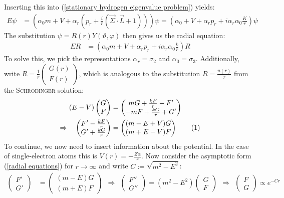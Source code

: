 \documentclass[a4paper,12pt]{article}
\newcommand\numberthis{\addtocounter{equation}{1}\tag{\theequation}}
\newcommand{\kla}{}
\begin{document}
Inserting this into (\ref{stationary hydrogen eigenvalue problem}) yields:
\begin{align*}
E\psi&=\kla\left( {\alpha_0m+V+\alpha_r\kla\left( {p_r+\frac{i}{r}(\vec{\Sigma}\cdot\vec{L}+1)} \right)} \right)\psi=\kla\left( {\alpha_0+V+\alpha_rp_r+i\alpha_r\alpha_0\frac{K}{r}} \right)\psi
\end{align*}
The substitution $\psi=R(r)Y(\vartheta,\varphi)$ then gives us the radial equation:
\begin{align*}
ER&=\kla\left( {\alpha_0m+V+\alpha_rp_r+i\alpha_r\alpha_0\frac{k}{r}} \right)R
\end{align*}
To solve this, we pick the representations $\alpha_r=\sigma_2$ and $\alpha_0=\sigma_3$. Additionally, write $R=\frac{1}{r}\begin{pmatrix}
G(r) \\ F(r)
\end{pmatrix} $, which is analogous to the substitution $R=\frac{u(r)}{r}$ from the \textsc{Schrödinger} solution:
\begin{align*}
(E-V)\begin{pmatrix}
G \\ F
\end{pmatrix}&=\begin{pmatrix}
mG+\frac{kF}{r}-F' \\ -mF+\frac{kG}{r}+G'
\end{pmatrix} \\
\Rightarrow\ \ \ \begin{pmatrix}
F'-\frac{kF}{r} \\ G'+\frac{kG}{r}
\end{pmatrix}&=\begin{pmatrix}
(m-E+V)G \\ (m+E-V)F
\end{pmatrix}\numberthis\label{radial equations}
\end{align*}
To continue, we now need to insert information about the potential. In the case of single-electron atoms this is $V(r)=-\frac{Z\alpha}{r}$. Now consider the asymptotic form (\ref{radial equations}) for $r\rightarrow\infty$ and write $C:=\sqrt{m^2-E^2}$:
\begin{align*}\begin{pmatrix}
F' \\ G'
\end{pmatrix}&=\begin{pmatrix}
(m-E)G \\ (m+E)F
\end{pmatrix}\ \ \Rightarrow\ \ \begin{pmatrix}
F'' \\ G''
\end{pmatrix}=(m^2-E^2)\begin{pmatrix}
G \\ F
\end{pmatrix}\ \ \Rightarrow\ \ \begin{pmatrix}
F \\ G
\end{pmatrix}\propto e^{-Cr}
\end{align*}
\end{document}
